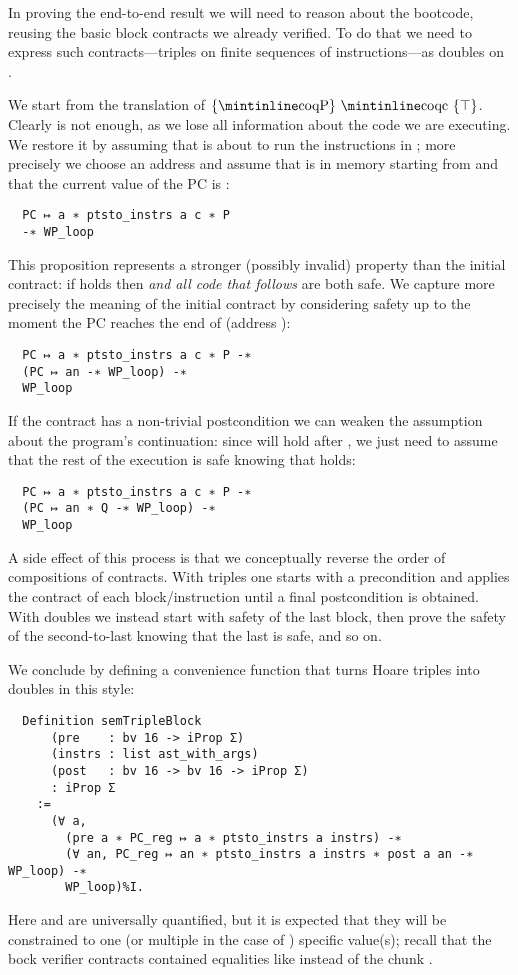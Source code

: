 In proving the end-to-end result we will need to reason about the bootcode, reusing the basic block contracts we already verified. To do that we need to express such contracts---triples on finite sequences of instructions---as doubles on .

We start from the translation of \(\hoare{\text{\coq{P}}}{\text{\coq{c}}}{\top}\). Clearly  is not enough, as we lose all information about the code we are executing. We restore it by assuming that  is about to run the instructions in ; more precisely we choose an address  and assume that  is in memory starting from  and that the current value of the PC is :
\begin{verbatim}
  PC ↦ a ∗ ptsto_instrs a c ∗ P
  -∗ WP_loop
\end{verbatim}
This proposition represents a stronger (possibly invalid) property than the initial contract: if  holds then  \emph{and all code that follows} are both safe. We capture more precisely the meaning of the initial contract by considering safety up to the moment the PC reaches the end of  (address ):
\begin{verbatim}
  PC ↦ a ∗ ptsto_instrs a c ∗ P -∗
  (PC ↦ an -∗ WP_loop) -∗
  WP_loop
\end{verbatim}
If the contract has a non-trivial postcondition  we can weaken the assumption about the program's continuation: since  will hold after , we just need to assume that the rest of the execution is safe knowing that  holds:
\begin{verbatim}
  PC ↦ a ∗ ptsto_instrs a c ∗ P -∗
  (PC ↦ an ∗ Q -∗ WP_loop) -∗
  WP_loop
\end{verbatim}

A side effect of this process is that we conceptually reverse the order of compositions of contracts. With triples one starts with a precondition and applies the contract of each block/instruction until a final postcondition is obtained. With doubles we instead start with safety of the last block, then prove the safety of the second-to-last knowing that the last is safe, and so on.

We conclude by defining a convenience function that turns Hoare triples into doubles in this style:
\begin{verbatim}
  Definition semTripleBlock
      (pre    : bv 16 -> iProp Σ)
      (instrs : list ast_with_args)
      (post   : bv 16 -> bv 16 -> iProp Σ)
      : iProp Σ
    :=
      (∀ a,
        (pre a ∗ PC_reg ↦ a ∗ ptsto_instrs a instrs) -∗
        (∀ an, PC_reg ↦ an ∗ ptsto_instrs a instrs ∗ post a an -∗ WP_loop) -∗
        WP_loop)%I.
\end{verbatim}
Here  and  are universally quantified, but it is expected that they will be constrained to one (or multiple in the case of ) specific value(s); recall that the bock verifier contracts contained equalities like  instead of the chunk .

